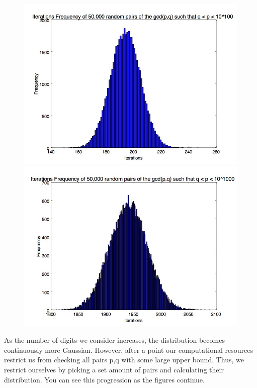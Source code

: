 \documentclass[11pt]{article}
\begin{document}
	\begin{figure}
		\centering
		\includegraphics[scale=.45]{100_digit_numbers_freq.jpg}
		\includegraphics[scale=.45]{1000_digit_numbers.jpg}
		
	\end{figure}
	\newpage
	As the number of digits we consider increases, the distribution	 becomes continuously more Gaussian. However, after a point our computational resources restrict us from checking all pairs p,q with some large upper bound. Thus, we restrict ourselves by picking a set amount of pairs and calculating their distribution. You can see this progression as the figures continue.\\
	
\end{document}
